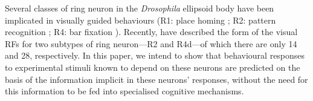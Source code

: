 Several classes of ring neuron in the \emph{Drosophila} ellipsoid body have been implicated in visually guided behaviours (R1: place homing \cite{Ofstad2011,Sitaraman2010,Sitaraman2008}; R2: pattern recognition \cite{Pan2009,Liu2006,Ernst1999}; R4: bar fixation \cite{Neuser2008}).
Recently, \cite{Seelig2013} have described the form of the visual \acp{RF} for two subtypes of ring neuron---R2 and R4d---of which there are only 14 and 28, respectively.
In this paper, we intend to show that behavioural responses to experimental stimuli known to depend on these neurons are predicted on the basis of the information implicit in these neurons' responses, without the need for this information to be fed into specialised cognitive mechanisms.

